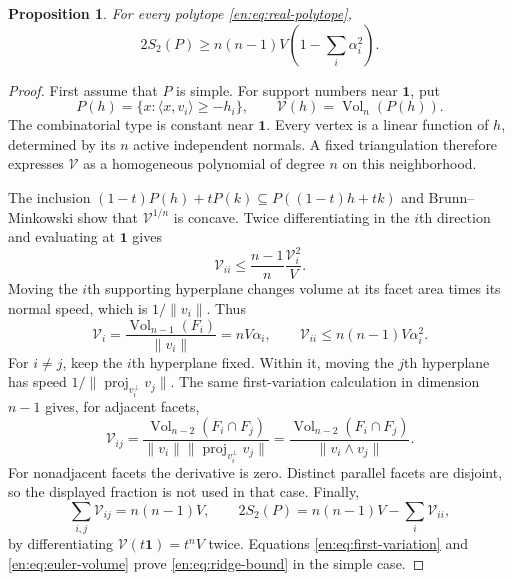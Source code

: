 \documentclass[12pt]{amsart}
\newtheorem{prop}[thm]{Proposition}
\theoremstyle{definition}
\theoremstyle{remark}
\numberwithin{equation}{section}
\theoremstyle{plain}
\theoremstyle{definition}
\theoremstyle{remark}
\begin{document}
\begin{prop}\label{en:prop:ridge}
For every polytope \eqref{en:eq:real-polytope},
\begin{equation}\label{en:eq:ridge-bound}
 2S_2(P)\ge n(n-1)V\left(1-\sum_i\alpha_i^2\right).
\end{equation}
\end{prop}
\begin{proof}
First assume that $P$ is simple. For support numbers near $\mathbf1$, put
\begin{equation}\label{en:eq:support}
 P(h)=\{x:\langle x,v_i\rangle\ge-h_i\},\qquad
 \mathcal V(h)=\operatorname{Vol}_n(P(h)).
\end{equation}
The combinatorial type is constant near $\mathbf1$. Every vertex is a linear function of $h$, determined by its $n$ active independent normals. A fixed triangulation therefore expresses $\mathcal V$ as a homogeneous polynomial of degree $n$ on this neighborhood.

The inclusion
$(1-t)P(h)+tP(k)\subseteq P((1-t)h+tk)$ and Brunn--Minkowski show that
$\mathcal V^{1/n}$ is concave. Twice differentiating in the $i$th direction and evaluating at $\mathbf1$ gives
\begin{equation}\label{en:eq:hessian-diagonal}
 \mathcal V_{ii}\le\frac{n-1}{n}\frac{\mathcal V_i^2}{V}.
\end{equation}
Moving the $i$th supporting hyperplane changes volume at its facet area times its normal speed, which is $1/\|v_i\|$. Thus
\begin{equation}\label{en:eq:first-variation}
 \mathcal V_i=\frac{\operatorname{Vol}_{n-1}(F_i)}{\|v_i\|}
 =nV\alpha_i,\qquad
 \mathcal V_{ii}\le n(n-1)V\alpha_i^2.
\end{equation}
For $i\ne j$, keep the $i$th hyperplane fixed. Within it, moving the $j$th hyperplane has speed
$1/\|\operatorname{proj}_{v_i^\perp}v_j\|$. The same first-variation calculation in dimension $n-1$ gives, for adjacent facets,
\begin{equation}\label{en:eq:mixed-variation}
 \mathcal V_{ij}
 =\frac{\operatorname{Vol}_{n-2}(F_i\cap F_j)}
 {\|v_i\|\|\operatorname{proj}_{v_i^\perp}v_j\|}
 =\frac{\operatorname{Vol}_{n-2}(F_i\cap F_j)}
 {\|v_i\wedge v_j\|}.
\end{equation}
For nonadjacent facets the derivative is zero. Distinct parallel facets are disjoint, so the displayed fraction is not used in that case. Finally,
\begin{equation}\label{en:eq:euler-volume}
 \sum_{i,j}\mathcal V_{ij}=n(n-1)V,\qquad
 2S_2(P)=n(n-1)V-\sum_i\mathcal V_{ii},
\end{equation}
by differentiating $\mathcal V(t\mathbf1)=t^nV$ twice. Equations
\eqref{en:eq:first-variation} and \eqref{en:eq:euler-volume} prove
\eqref{en:eq:ridge-bound} in the simple case.


\end{proof}
\end{document}
